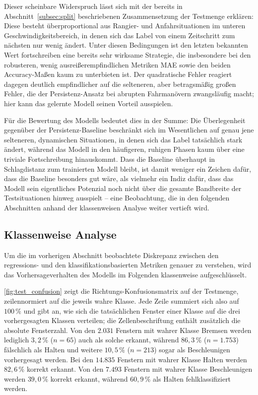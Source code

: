 Dieser scheinbare Widerspruch lässt sich mit der bereits in Abschnitt~\ref{subsec:split} beschriebenen Zusammensetzung der Testmenge erklären: Diese besteht überproportional aus Rangier- und Anfahrsituationen im unteren Geschwindigkeitsbereich, in denen sich das Label von einem Zeitschritt zum nächsten nur wenig ändert. Unter diesen Bedingungen ist \glqq den letzten bekannten Wert fortschreiben\grqq{} eine bereits sehr wirksame Strategie, die insbesondere bei den robusteren, wenig ausreißerempfindlichen Metriken \gls{MAE} sowie den beiden Accuracy-Maßen kaum zu unterbieten ist. Der quadratische Fehler reagiert dagegen deutlich empfindlicher auf die selteneren, aber betragsmäßig großen Fehler, die der Persistenz-Ansatz bei abrupten Fahrmanövern zwangsläufig macht; hier kann das gelernte Modell seinen Vorteil ausspielen.

Für die Bewertung des Modells bedeutet dies in der Summe: Die Überlegenheit gegenüber der Persistenz-Baseline beschränkt sich im Wesentlichen auf genau jene selteneren, dynamischen Situationen, in denen sich das Label tatsächlich stark ändert, während das Modell in den häufigeren, ruhigen Phasen kaum über eine triviale Fortschreibung hinauskommt. Dass die Baseline überhaupt in Schlagdistanz zum trainierten Modell bleibt, ist damit weniger ein Zeichen dafür, dass die Baseline besonders gut wäre, als vielmehr ein Indiz dafür, dass das Modell sein eigentliches Potenzial noch nicht über die gesamte Bandbreite der Testsituationen hinweg ausspielt -- eine Beobachtung, die in den folgenden Abschnitten anhand der klassenweisen Analyse weiter vertieft wird.
\subsection{Klassenweise Analyse}
\label{subsec:klassenweise_analyse}

Um die im vorherigen Abschnitt beobachtete Diskrepanz zwischen den regressions- und den klassifikationsbasierten Metriken genauer zu verstehen, wird das Vorhersageverhalten des Modells im Folgenden klassenweise aufgeschlüsselt.

\autoref{fig:test_confusion} zeigt die Richtungs-Konfusionsmatrix auf der Testmenge, zeilennormiert auf die jeweils wahre Klasse. Jede Zeile summiert sich also auf $100\,\%$ und gibt an, wie sich die tatsächlichen Fenster einer Klasse auf die drei vorhergesagten Klassen verteilen; die Zellenbeschriftung enthält zusätzlich die absolute Fensterzahl. Von den $2.031$ Fenstern mit wahrer Klasse \glqq Bremsen\grqq{} werden lediglich $3{,}2\,\%$ ($n=65$) auch als solche erkannt, während $86{,}3\,\%$ ($n=1{.}753$) fälschlich als \glqq Halten\grqq{} und weitere $10{,}5\,\%$ ($n=213$) sogar als \glqq Beschleunigen\grqq{} vorhergesagt werden. Bei den $14.835$ Fenstern mit wahrer Klasse \glqq Halten\grqq{} werden $82{,}6\,\%$ korrekt erkannt. Von den $7.493$ Fenstern mit wahrer Klasse \glqq Beschleunigen\grqq{} werden $39{,}0\,\%$ korrekt erkannt, während $60{,}9\,\%$ als \glqq Halten\grqq{} fehlklassifiziert werden.

